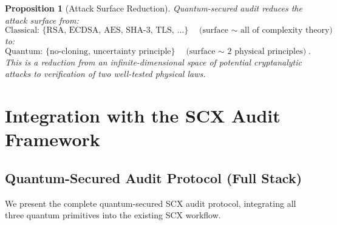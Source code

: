\documentclass[11pt,a4paper]{article}
\theoremstyle{plain}
\newtheorem{proposition}[theorem]{Proposition}
\theoremstyle{definition}
\theoremstyle{remark}
\begin{document}
\begin{proposition}[Attack Surface Reduction]
\label{prop:attack_surface}
Quantum-secured audit reduces the attack surface from:
\[
\text{Classical: } \{\text{RSA, ECDSA, AES, SHA-3, TLS, \ldots}\} \quad
\text{(surface $\sim$ all of complexity theory)}
\]
to:
\[
\text{Quantum: } \{\text{no-cloning, uncertainty principle}\} \quad
\text{(surface $\sim$ 2 physical principles)}.
\]
This is a reduction from an infinite-dimensional space of potential
cryptanalytic attacks to verification of two well-tested physical laws.
\end{proposition}

\section{Integration with the SCX Audit Framework}
\label{sec:integration}

\subsection{Quantum-Secured Audit Protocol (Full Stack)}
\label{sec:integration_protocol}

We present the complete quantum-secured SCX audit protocol, integrating
all three quantum primitives into the existing SCX workflow.
\end{document}
